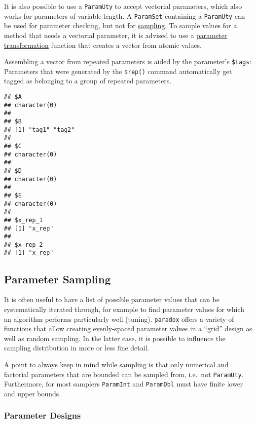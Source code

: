 \documentclass[
]{scrbook}
\newenvironment{Shaded}{\begin{snugshade}}{\end{snugshade}}
\newcommand{\NormalTok}[1]{#1}
\newcommand{\SpecialCharTok}[1]{\textcolor[rgb]{0.00,0.00,0.00}{#1}}
\renewenvironment{Shaded} {\begin{snugshade}\small} {\end{snugshade}}
\begin{document}
It is also possible to use a \texttt{ParamUty} to accept vectorial parameters, which also works for parameters of variable length.
A \texttt{ParamSet} containing a \texttt{ParamUty} can be used for parameter checking, but not for \protect\hyperlink{parameter-sampling}{sampling}.
To sample values for a method that needs a vectorial parameter, it is advised to use a \protect\hyperlink{transformation-between-types}{parameter transformation} function that creates a vector from atomic values.

Assembling a vector from repeated parameters is aided by the parameter's \texttt{\$tags}: Parameters that were generated by the \texttt{\$rep()} command automatically get tagged as belonging to a group of repeated parameters.

\begin{Shaded}
\end{Shaded}

\begin{verbatim}
## $A
## character(0)
## 
## $B
## [1] "tag1" "tag2"
## 
## $C
## character(0)
## 
## $D
## character(0)
## 
## $E
## character(0)
## 
## $x_rep_1
## [1] "x_rep"
## 
## $x_rep_2
## [1] "x_rep"
\end{verbatim}

\hypertarget{parameter-sampling}{%
\subsection{Parameter Sampling}\label{parameter-sampling}}

It is often useful to have a list of possible parameter values that can be systematically iterated through, for example to find parameter values for which an algorithm performs particularly well (tuning).
\texttt{paradox} offers a variety of functions that allow creating evenly-spaced parameter values in a ``grid'' design as well as random sampling.
In the latter case, it is possible to influence the sampling distribution in more or less fine detail.

A point to always keep in mind while sampling is that only numerical and factorial parameters that are bounded can be sampled from, i.e.~not \texttt{ParamUty}.
Furthermore, for most samplers \texttt{ParamInt} and \texttt{ParamDbl} must have finite lower and upper bounds.

\hypertarget{parameter-designs}{%
\subsubsection{Parameter Designs}\label{parameter-designs}}
\end{document}
